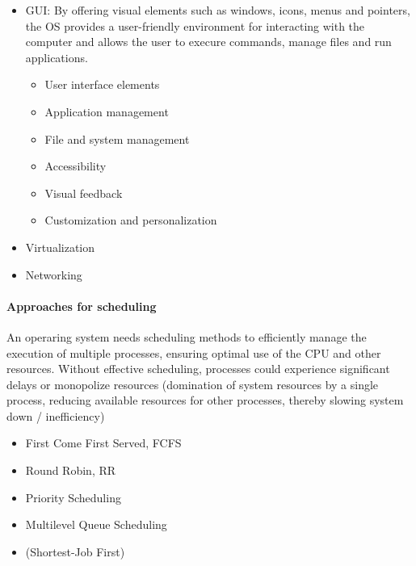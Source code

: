 \begin{itemize}
    \begin{itemize}
        \item Resource usage tracking
        \item Process accounting
        \item User accounting
        \item Performance monitoring
        \item Auditing and reporting
        \item Billing and chargeback
        \end{itemize}
    \item GUI: By offering visual elements such as windows, icons, menus and pointers, the OS provides a user-friendly environment for interacting with the computer and allows the user to execure commands, manage files and run applications. 
    \begin{itemize}
        \item User interface elements
        \item Application management
        \item File and system management
        \item Accessibility
        \item Visual feedback
        \item Customization and personalization
        \end{itemize}
    \item Virtualization
    \item Networking
\end{itemize}
\paragraph{Approaches for scheduling}
An operaring system needs scheduling methods to efficiently manage the execution of multiple processes, ensuring optimal use of the CPU and other resources. Without effective scheduling, processes could experience significant delays or monopolize resources (domination of system resources by a single process, reducing available resources for other processes, thereby slowing system down / inefficiency)
\begin{itemize}
    \item First Come First Served, FCFS
    \item Round Robin, RR
    \item Priority Scheduling
    \item Multilevel Queue Scheduling
    \item (Shortest-Job First)
\end{itemize}
